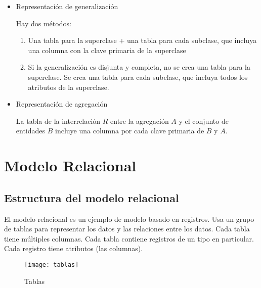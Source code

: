 \documentclass[a4paper, twoside]{article}
\begin{document}
\begin{itemize}
	\item Representación de generalización

	Hay dos métodos:
	\begin{enumerate}
		\item Una tabla para la superclase + una tabla para cada subclase, que incluya una columna con la clave primaria de la superclase
		\item Si la generalización es disjunta y completa, no se crea una tabla para la superclase. Se crea una tabla para cada subclase, que incluya todos los atributos de la superclase.
	\end{enumerate}

	\item Representación de agregación

	La tabla de la interrelación $R$ entre la agregación $A$ y el conjunto de entidades $B$ incluye una columna por cada clave primaria de $B$ y $A$.
\end{itemize}

\newpage
\section{Modelo Relacional}
\subsection{Estructura del modelo relacional}
El modelo relacional es un ejemplo de modelo basado en registros. Usa un grupo de tablas para representar los datos y las relaciones entre los datos. Cada tabla tiene múltiples columnas. Cada tabla contiene registros de un tipo en particular. Cada registro tiene atributos (las columnas).

\begin{figure}[H]
	\centering
	\texttt{[image: tablas]}
	\caption{Tablas}
\end{figure}
\end{document}
